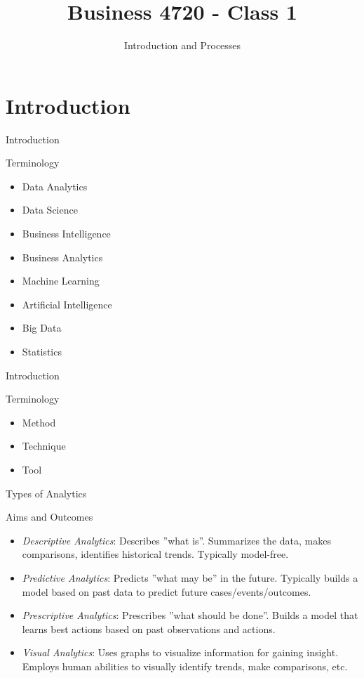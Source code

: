 \documentclass[ignorenonframetext,xcolor=dvipsnames]{beamer}
\title{Business 4720 - Class 1}
\subtitle{Introduction and Processes}
\begin{document}
\begin{frame}[label=full]{}
  \titlepage
  \footnotesize
  
\end{frame}

\section{Introduction}

\begin{frame}[label=full]{Introduction}
\begin{block}{Terminology}
  \begin{itemize}
    \item Data Analytics
    \item Data Science
    \item Business Intelligence
    \item Business Analytics
    \item Machine Learning
    \item Artificial Intelligence
    \item Big Data
    \item Statistics
  \end{itemize}
\end{block}
\end{frame}

\begin{frame}[label=full]{Introduction}
\begin{block}{Terminology}
  \begin{itemize}
    \item Method
    \item Technique
    \item Tool
  \end{itemize}
\end{block}
\end{frame}

\begin{frame}[label=full]{Types of Analytics}
\begin{block}{Aims and Outcomes}
\begin{itemize}
	\item \emph{Descriptive Analytics}: Describes ''what is''. Summarizes the data, makes comparisons, identifies historical trends. Typically model-free.
	\item \emph{Predictive Analytics}: Predicts ''what may be'' in the future. Typically builds a model based on past data to predict future cases/events/outcomes. 
	\item \emph{Prescriptive Analytics}: Prescribes ''what should be done''. Builds a model that learns best actions based on past observations and actions. 
	\item \emph{Visual Analytics}: Uses graphs to visualize information for gaining insight. Employs human abilities to visually identify trends, make comparisons, etc. 
\end{itemize}
\end{block}
\end{frame}
\end{document}
